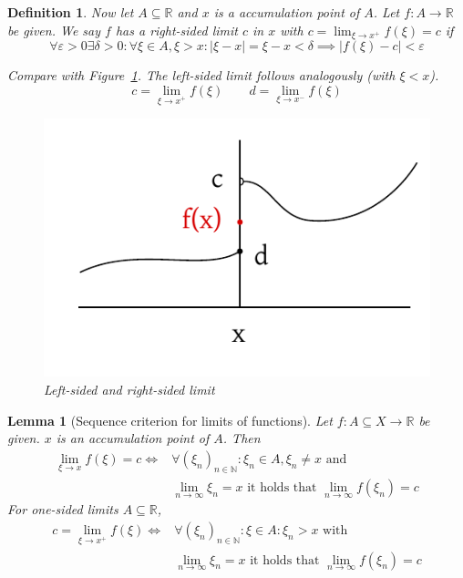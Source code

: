 \documentclass{article}
\newtheorem{definition}{Definition}  \numberwithin{definition}{section}
\newtheorem{lemma}{Lemma}  \numberwithin{lemma}{section}
\newcommand{\card}[1]{\left|#1\right|}
\begin{document}
\begin{definition} %
  Now let $A \subseteq \mathbb R$ and $x$ is a accumulation point of $A$.
  Let $f: A \to \mathbb R$ be given. We say $f$ has a right-sided limit $c$ in $x$
  with $c = \lim_{\xi \to x^+} f(\xi) = c$ if
  \[ \forall \varepsilon > 0 \exists \delta > 0: \forall \xi \in A, \xi > x: \card{\xi - x} = \xi - x < \delta \implies \card{f(\xi) - c} < \varepsilon \]

  Compare with Figure~\ref{img:def5}.
  The left-sided limit follows analogously (with $\xi < x$).
  \[ c = \lim_{\xi \to x^+} f(\xi) \qquad d = \lim_{\xi \to x^-} f(\xi) \]

  \begin{figure}[t]
    \begin{center}
      \includegraphics{img/14b_def5.pdf}
      \caption{Left-sided and right-sided limit}
      \label{img:def5}
    \end{center}
  \end{figure}
\end{definition}

\begin{lemma}[Sequence criterion for limits of functions] %
  \label{lemma5}
  Let $f: A \subseteq X \to \mathbb R$ be given. $x$ is an accumulation point of $A$.
  Then
  \begin{align*}
    \lim_{\xi \to x} f(\xi) = c \iff &\forall (\xi_n)_{n\in\mathbb N}: \xi_n \in A, \xi_n \neq x \text{ and } \\
                                     &\lim_{n\to\infty} \xi_n = x \text{ it holds that } \lim_{n\to\infty} f(\xi_n) = c
  \end{align*}
  For one-sided limits $A \subseteq \mathbb R$,
  \begin{align*}
    c = \lim_{\xi\to x^{+}} f(\xi) \iff &\forall (\xi_n)_{n\in\mathbb N}: \xi \in A: \xi_n > x \text{ with } \\
                                        &\lim_{n\to\infty} \xi_n = x \text{ it holds that } \lim_{n\to\infty} f(\xi_n) = c
  \end{align*}
\end{lemma}
\end{document}
